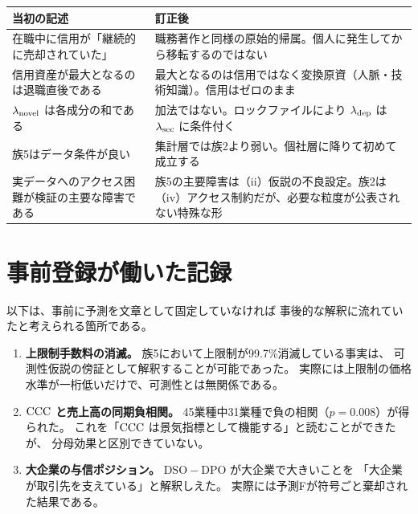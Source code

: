 \begin{center}
\begin{tabularx}{\textwidth}{@{}XX@{}}
\toprule
当初の記述 & 訂正後 \\
\midrule
在職中に信用が「継続的に売却されていた」
& 職務著作と同様の原始的帰属。個人に発生してから移転するのではない \\
\addlinespace
信用資産が最大となるのは退職直後である
& 最大となるのは信用ではなく変換原資（人脈・技術知識）。信用はゼロのまま \\
\addlinespace
$\lambda_{\rm novel}$ は各成分の和である
& 加法ではない。ロックファイルにより $\lambda_{\rm dep}$ は $\lambda_{\rm sec}$ に条件付く \\
\addlinespace
族5はデータ条件が良い
& 集計層では族2より弱い。個社層に降りて初めて成立する \\
\addlinespace
実データへのアクセス困難が検証の主要な障害である
& 族5の主要障害は（ii）仮説の不良設定。族2は（iv）アクセス制約だが、必要な粒度が公表されない特殊な形 \\
\bottomrule
\end{tabularx}
\label{tab:reasoning-corrections}
\end{center}

\section{事前登録が働いた記録}

以下は、事前に予測を文章として固定していなければ
事後的な解釈に流れていたと考えられる箇所である。

\begin{enumerate}[label=(\arabic*)]
\item \textbf{上限制手数料の消滅。}
族5において上限制が99.7\%消滅している事実は、
可測性仮説の傍証として解釈することが可能であった。
実際には上限制の価格水準が一桁低いだけで、可測性とは無関係である。

\item \textbf{$\mathrm{CCC}$ と売上高の同期負相関。}
45業種中31業種で負の相関（$p=0.008$）が得られた。
これを「$\mathrm{CCC}$ は景気指標として機能する」と読むことができたが、
分母効果と区別できていない。

\item \textbf{大企業の与信ポジション。}
$\mathrm{DSO}-\mathrm{DPO}$ が大企業で大きいことを
「大企業が取引先を支えている」と解釈しえた。
実際には予測Fが符号ごと棄却された結果である。
\end{enumerate}

